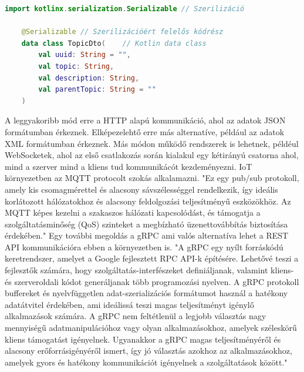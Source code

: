 \begin{lstlisting}[caption={Egy dto struktúrája. Szerilizáció: \refstruc{sec:KotlinX}}, label={lst:Model}, language=Kotlin]
    import kotlinx.serialization.Serializable // Szerilizáció

    @Serializable // Szerilizációért felelős kódrész
    data class TopicDto(    // Kotlin data class
        val uuid: String = "",
        val topic: String,
        val description: String,
        val parentTopic: String = ""
    )
\end{lstlisting}

A leggyakoribb mód erre a HTTP alapú kommunikáció, ahol az adatok JSON formátumban érkeznek.
Elképezelehtő erre más alternatíve, például az adatok XML formátumban érkeznek.
Más módon működő rendszerek is lehetnek, példéul WebSocketek, ahol az első csatlakozás során kialakul egy kétirányú csatorna ahol, mind a szerver mind a kliens tud kommunikácót kezdeményezni.
IoT környezetben az MQTT protocolt szokás alkalamazni. "Ez egy pub/sub protokoll, amely kis csomagmérettel és alacsony sávszélességgel rendelkezik, így ideális korlátozott hálózatokhoz és alacsony feldolgozási teljesítményű eszközökhöz. Az MQTT képes kezelni a szakaszos hálózati kapcsolódást, és támogatja a szolgáltatásminőség (QoS) szinteket a megbízható üzenettovábbítás biztosítása érdekében." \cite{RESTAPIAlternatives}
Egy további megoldás a gRPC ami valós alternatíva lehet a REST API kommunikációra ebben a környezetben is. "A gRPC egy nyílt forráskódú keretrendszer, amelyet a Google fejlesztett RPC API-k építésére. Lehetővé teszi a fejlesztők számára, hogy szolgáltatás-interfészeket definiáljanak, valamint kliens- és szerveroldali kódot generáljanak több programozási nyelven. A gRPC protokoll buffereket és nyelvfüggetlen adat-szerializációs formátumot használ a hatékony adatátvitel érdekében, ami ideálissá teszi magas teljesítményt igénylő alkalmazások számára. A gRPC nem feltétlenül a legjobb választás nagy mennyiségű adatmanipulációhoz vagy olyan alkalmazásokhoz, amelyek széleskörű kliens támogatást igényelnek. Ugyanakkor a gRPC magas teljesítményéről és alacsony erőforrásigényéről ismert, így jó választás azokhoz az alkalmazásokhoz, amelyek gyors és hatékony kommunikációt igényelnek a szolgáltatások között." \cite{RESTAPIAlternatives}

